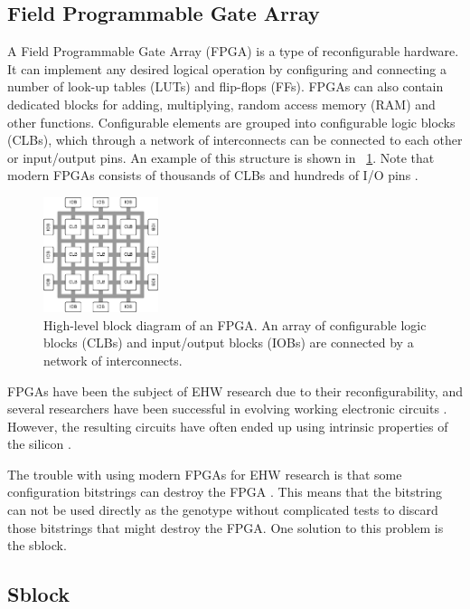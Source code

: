 \subsection{Field Programmable Gate Array}

A Field Programmable Gate Array (FPGA) is a type of reconfigurable hardware.
It can implement any desired logical operation by configuring and connecting a number of look-up tables (LUTs) and flip-flops (FFs).
FPGAs can also contain dedicated blocks for adding, multiplying, random access memory (RAM) and other functions.
Configurable elements are grouped into configurable logic blocks (CLBs), which through a network of interconnects can be connected to each other or input/output pins.
An example of this structure is shown in \figurename~\ref{fig:fpga}.
Note that modern FPGAs consists of thousands of CLBs and hundreds of I/O pins \cite{ds160}.

\begin{figure}[!ht]
    \centering
    \includegraphics[width=0.30\textwidth]{figures/fpga}
    \caption{High-level block diagram of an FPGA. An array of configurable logic blocks (CLBs) and input/output blocks (IOBs) are connected by a network of interconnects.}
    \label{fig:fpga}
\end{figure}

FPGAs have been the subject of EHW research due to their reconfigurability, and several researchers have been successful in evolving working electronic circuits \cite{huelsbergen1998evolution, thompson1997evolved}.
However, the resulting circuits have often ended up using intrinsic properties of the silicon \CN.

The trouble with using modern FPGAs for EHW research is that some configuration bitstrings can destroy the FPGA \cite{ug380, xapp151}.
This means that the bitstring can not be used directly as the genotype without complicated tests to discard those bitstrings that might destroy the FPGA.
One solution to this problem is the sblock. 

\subsection{Sblock}

